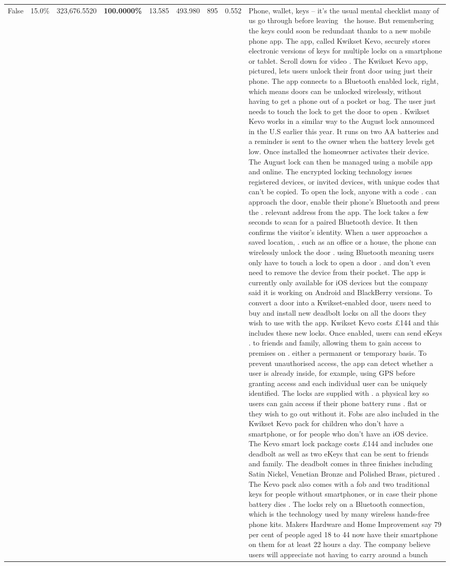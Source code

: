 \begin{table}[H]
\begin{tabular}{lllrlllll}
False & 15.0\% & 323,676.5520 & \bfseries \color{red} 100.0000\% & 13.585 & 493.980 & 895 & 0.552 & Phone, wallet, keys – it’s the usual mental checklist many of us go through before leaving  the house. But remembering the keys could soon be redundant thanks to a new mobile phone app. The app, called Kwikset Kevo, securely stores electronic versions of keys for multiple locks on a smartphone or tablet. Scroll down for video . The Kwikset Kevo app, pictured, lets users unlock their front door using just their phone. The app connects to a Bluetooth enabled lock, right, which means doors can be unlocked wirelessly, without having to get a phone out of a pocket or bag. The user just needs to touch the lock to get the door to open . Kwikset Kevo works in a similar way to the August lock announced in the U.S earlier this year. It runs on two AA batteries and a reminder is sent to the owner when the battery levels get low. Once installed the homeowner activates their device. The August lock can then be managed using a mobile app and online. The encrypted locking technology issues registered devices, or invited devices, with unique codes that can't be copied. To open the lock, anyone with a code . can approach the door, enable their phone's Bluetooth and press the . relevant address from the app. The lock takes a few seconds to scan for a paired Bluetooth device. It then confirms the visitor's identity. When a user approaches a saved location, . such as an office or a house, the phone can wirelessly unlock the door . using Bluetooth meaning users only have to touch a lock to open a door . and don't even need to remove the device from their pocket. The app is currently only available for iOS devices but the company said it is working on Android and BlackBerry versions. To convert a door into a Kwikset-enabled door, users need to buy and install new deadbolt locks on all the doors they wish to use with the app. Kwikset Kevo costs £144 and this includes these new locks. Once enabled, users can send eKeys . to friends and family, allowing them to gain access to premises on . either a permanent or temporary basis. To prevent unauthorised access, the app can detect whether a user is already inside, for example, using GPS before granting access and each individual user can be uniquely identified. The locks are supplied with . a physical key so users can gain access if their phone battery runs . flat or they wish to go out without it. Fobs are also included in the Kwikset Kevo pack for children who don't have a smartphone, or for people who don't have an iOS device. The Kevo smart lock package costs £144 and includes one deadbolt as well as two eKeys that can be sent to friends and family. The deadbolt comes in three finishes including Satin Nickel, Venetian Bronze and Polished Brass, pictured . The Kevo pack also comes with a fob and two traditional keys for people without smartphones, or in case their phone battery dies . The locks rely on a Bluetooth connection, which is the technology used by many wireless hands-free phone kits. Makers Hardware and Home Improvement say 79 per cent of people aged 18 to 44 now have their smartphone on them for at least 22 hours a day. The company believe users will appreciate not having to carry around a bunch 
\end{tabular}
\end{table}
